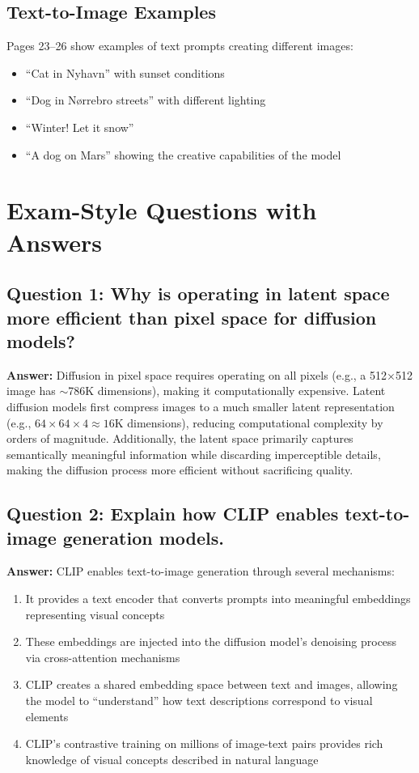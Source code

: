 \subsection*{Text-to-Image Examples}
Pages 23–26 show examples of text prompts creating different images:
\begin{itemize}
    \item ``Cat in Nyhavn'' with sunset conditions
    \item ``Dog in Nørrebro streets'' with different lighting
    \item ``Winter! Let it snow''
    \item ``A dog on Mars'' showing the creative capabilities of the model
\end{itemize}
\section{Exam-Style Questions with Answers}

\subsection*{Question 1: Why is operating in latent space more efficient than pixel space for diffusion models?}
\textbf{Answer:} Diffusion in pixel space requires operating on all pixels (e.g., a 512×512 image has $\sim$786K dimensions), making it computationally expensive. Latent diffusion models first compress images to a much smaller latent representation (e.g., $64\times64\times4 \approx 16$K dimensions), reducing computational complexity by orders of magnitude. Additionally, the latent space primarily captures semantically meaningful information while discarding imperceptible details, making the diffusion process more efficient without sacrificing quality.

\subsection*{Question 2: Explain how CLIP enables text-to-image generation models.}
\textbf{Answer:} CLIP enables text-to-image generation through several mechanisms:
\begin{enumerate}
    \item It provides a text encoder that converts prompts into meaningful embeddings representing visual concepts
    \item These embeddings are injected into the diffusion model’s denoising process via cross-attention mechanisms
    \item CLIP creates a shared embedding space between text and images, allowing the model to “understand” how text descriptions correspond to visual elements
    \item CLIP’s contrastive training on millions of image-text pairs provides rich knowledge of visual concepts described in natural language
\end{enumerate}

